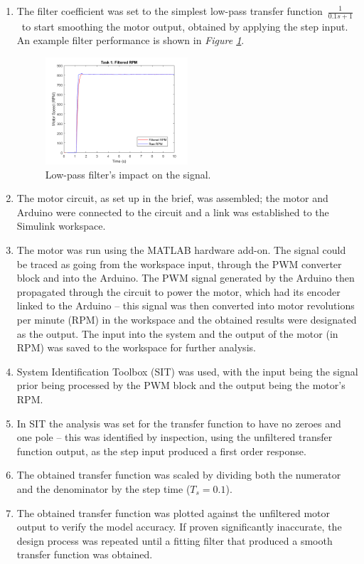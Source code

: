 \documentclass[11pt, onecolumn]{article}
\begin{document}
\begin{enumerate}
    \item The filter coefficient was set to the simplest low-pass transfer function $\frac{1}{0.1s+1}$ to start smoothing the motor output, obtained by applying the step input. An example filter performance is shown in \textit{Figure \ref{fig:q1-filter}}.
          \begin{figure}[h!]
              \centering
              \includegraphics[width=0.5\textwidth]{q1-filter.png}
              \caption{Low-pass filter's impact on the signal.}
              \label{fig:q1-filter}
          \end{figure}
    \item The motor circuit, as set up in the brief, was assembled; the motor and Arduino were connected to the circuit and a link was established to the Simulink workspace.
    \item The motor was run using the MATLAB hardware add-on. The signal could be traced as going from the workspace input, through the PWM converter block and into the Arduino. The PWM signal generated by the Arduino then propagated through the circuit to power the motor, which had its encoder linked to the Arduino – this signal was then converted into motor revolutions per minute (RPM) in the workspace and the obtained results were designated as the output. The input into the system and the output of the motor (in RPM) was saved to the workspace for further analysis.
    \item System Identification Toolbox (SIT) was used, with the input being the signal prior being processed by the PWM block and the output being the motor's RPM.
    \item In SIT the analysis was set for the transfer function to have no zeroes and one pole – this was identified by inspection, using the unfiltered transfer function output, as the step input produced a first order response.
    \item The obtained transfer function was scaled by dividing both the numerator and the denominator by the step time ($T_s = 0.1$).
    \item The obtained transfer function was plotted against the unfiltered motor output to verify the model accuracy. If proven significantly inaccurate, the design process was repeated until a fitting filter that produced a smooth transfer function was obtained.
\end{enumerate}
\end{document}
